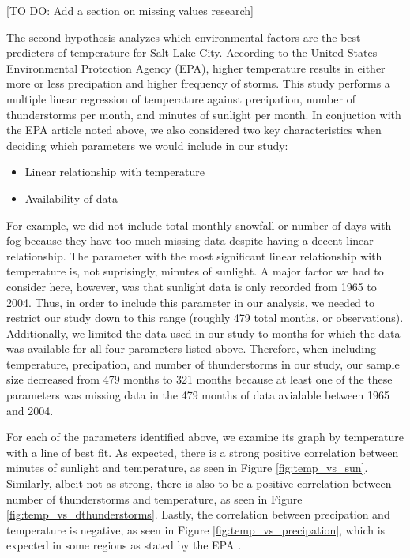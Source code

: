 [TO DO: Add a section on missing values research]

The second hypothesis analyzes which environmental factors are the best predicters of temperature for Salt Lake City. According to the United States Environmental Protection Agency (EPA), higher temperature results in either more or less precipation and higher frequency of storms\cite{epa_utah}. This study performs a multiple linear regression of temperature against precipation, number of thunderstorms per month, and minutes of sunlight per month. In conjuction with the EPA article noted above, we also considered two key characteristics when deciding which parameters we would include in our study: 

\begin{itemize}
	\item Linear relationship with temperature
	\item Availability of data
\end{itemize}

For example, we did not include total monthly snowfall or number of days with fog because they have too much missing data despite having a decent linear relationship. The parameter with the most significant linear relationship with temperature is, not suprisingly, minutes of sunlight. A major factor we had to consider here, however, was that sunlight data is only recorded from 1965 to 2004. Thus, in order to include this parameter in our analysis, we needed to restrict our study down to this range (roughly 479 total months, or observations). Additionally, we limited the data used in our study to months for which the data was available for all four parameters listed above. Therefore, when including temperature, precipation, and number of thunderstorms in our study, our sample size decreased from 479 months to 321 months because at least one of the these parameters was missing data in the 479 months of data avialable between 1965 and 2004.

 For each of the parameters identified above, we examine its graph by temperature with a line of best fit. As expected, there is a strong positive correlation between minutes of sunlight and temperature, as seen in Figure \ref{fig:temp_vs_sun}. Similarly, albeit not as strong, there is also to be a positive correlation between number of thunderstorms and temperature, as seen in Figure \ref{fig:temp_vs_dthunderstorms}. Lastly, the correlation between precipation and temperature is negative, as seen in Figure \ref{fig:temp_vs_precipation}, which is expected in some regions as stated by the EPA \cite{epa_utah}.

